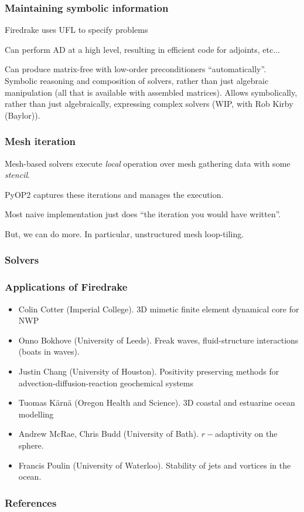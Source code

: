 \documentclass[presentation]{beamer}
\begin{document}
\begin{frame}
  \frametitle{Maintaining symbolic information}
  Firedrake uses UFL \cite{Alnaes:2014} to specify problems

  Can perform AD at a high level, resulting in efficient code for
  adjoints, etc...

  Can produce matrix-free with low-order preconditioners
  ``automatically''.  Symbolic reasoning and composition of solvers,
  rather than just algebraic manipulation (all that is available with
  assembled matrices).
  Allows symbolically, rather than just algebraically, expressing
  complex solvers (WIP, with Rob Kirby (Baylor)).
\end{frame}



\begin{frame}
  \frametitle{Mesh iteration}
  Mesh-based solvers execute \emph{local} operation over mesh
  gathering data with some \emph{stencil}.

  PyOP2 captures these iterations and manages the execution.

  Most naive implementation just does ``the iteration you would have
  written''.

  But, we can do more.  In particular, unstructured mesh loop-tiling.
\end{frame}

\begin{frame}
  \frametitle{Solvers}
  
\end{frame}

\begin{frame}
  \frametitle{Applications of Firedrake}
  \begin{itemize}
  \item Colin Cotter (Imperial College).  3D mimetic finite element
    dynamical core for NWP
  \item Onno Bokhove (University of Leeds). Freak waves,
    fluid-structure interactions (boats in waves).
  \item Justin Chang (University of Houston).  Positivity preserving
    methods for advection-diffusion-reaction geochemical systems
  \item Tuomas K\"arn\"a (Oregon Health and Science). 3D coastal and
    estuarine ocean modelling
  \item Andrew McRae, Chris Budd (University of Bath).  $r-$adaptivity
    on the sphere.
  \item Francis Poulin (University of Waterloo).  Stability of jets
    and vortices in the ocean.
  \end{itemize}
\end{frame}
\appendix
\begin{frame}[allowframebreaks]
  \frametitle{References}
  \printbibliography[heading=none]
\end{frame}
\end{document}
